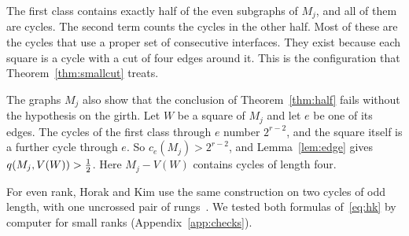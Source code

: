 The first class contains exactly half of the even subgraphs of $M_j$, and all of them are cycles.
The second term counts the cycles in the other half. Most of these are the cycles that use a
proper set of consecutive interfaces. They exist because each square is a cycle with a cut of four
edges around it. This is the configuration that Theorem~\ref{thm:smallcut} treats.

The graphs $M_j$ also show that the conclusion of Theorem~\ref{thm:half} fails without the
hypothesis on the girth. Let $W$ be a square of $M_j$ and let $e$ be one of its edges. The cycles
of the first class through $e$ number $2^{r-2}$, and the square itself is a further cycle through
$e$. So $c_e(M_j)>2^{r-2}$, and Lemma~\ref{lem:edge} gives $q(M_j,V(W))>\tfrac12$. Here $M_j-V(W)$
contains cycles of length four.

For even rank, Horak and Kim use the same construction on two cycles of odd length, with one
uncrossed pair of rungs~\cite[Section~5]{HK}. We tested both formulas of~\eqref{eq:hk} by computer
for small ranks (Appendix~\ref{app:checks}).
